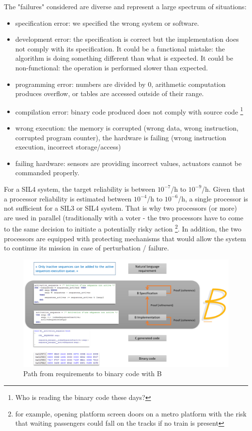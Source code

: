 \noindent The "failures" considered are diverse and represent a large spectrum of situations: 
\begin{itemize}
    \item specification error: we specified the wrong system or software.
    \item development error: the specification is correct but the implementation does not comply with its specification. It could be a functional mistake: the algorithm is doing something different than what is expected. It could be non-functional: the operation is performed slower than expected.
    \item programming error: numbers are divided by 0, arithmetic computation produces overflow, or tables are accessed outside of their range.
    \item compilation error: binary code produced does not comply with source code \footnote{Who is reading the binary code these days?}
    \item wrong execution: the memory is corrupted (wrong data, wrong instruction, corrupted program counter), the hardware is failing (wrong instruction execution, incorrect storage/access)
    \item failing hardware: sensors are providing incorrect values, actuators cannot be commanded properly.
\end{itemize}

For a SIL4 system, the target reliability is between $10^{-7}$/h to $10^{-9}$/h. Given that a processor reliability is estimated between $10^{-4}$/h to $10^{-6}$/h, a single processor is not sufficient for a SIL3 or SIL4 system. That is why two processors (or more) are used in parallel (traditionally with a voter - the two processors have to come to the same decision to initiate a potentially risky action \footnote{for example, opening platform screen doors on a metro platform with the risk that waiting passengers could fall on the tracks if no train is present}. In addition, the two processors are equipped with protecting mechanisms that would allow the system to continue its mission in case of perturbation / failure.  



\begin{figure}[h]
\centering\includegraphics[scale=0.3]{Pictures/chapterSafetyPrinciples/SAFETY-Bcycle.png}
\caption{Path from requirements to binary code with B}
\label{safety:B}
\end{figure}

